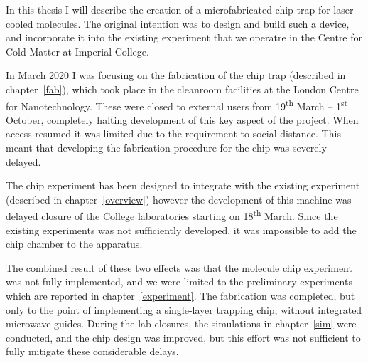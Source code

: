 In this thesis I will describe the creation of a microfabricated chip trap for
laser-cooled \CaF{} molecules. The original intention was to design and build
such a device, and incorporate it into the existing \CaF{} experiment that we
operatre in the Centre for Cold Matter at Imperial College.

In March 2020 I was focusing on the fabrication of the
chip trap (described in chapter~\ref{fab}), which took place in the cleanroom
facilities at the London Centre for Nanotechnology. These were closed to
external users from 19\textsuperscript{th} March -- 1\textsuperscript{st}
October, completely halting development of this key aspect of the project. When
access resumed it was limited due to the requirement to social distance. This
meant that developing the fabrication procedure for the chip was severely
delayed.

The chip experiment has been designed to integrate with the existing \CaF
experiment (described in chapter~\ref{overview}) however the development of
this machine was delayed closure of the College laboratories starting on
18\textsuperscript{th} March. Since the existing experiments was not
sufficiently developed, it was impossible to add the chip chamber to the
apparatus. 

The combined result of these two effects was that the molecule chip experiment
was not fully implemented, and we were limited to the preliminary experiments
which are reported in chapter~\ref{experiment}. The fabrication was completed,
but only to the point of implementing a single-layer trapping chip, without
integrated microwave guides. During the lab closures, the simulations in
chapter~\ref{sim} were conducted, and the chip design was improved, but this
effort was not sufficient to fully mitigate these considerable delays.
